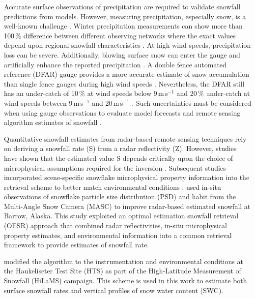 \documentclass{ametsocV5}
\begin{document}
    Accurate surface observations of precipitation are required to validate snowfall predictions from models. However, measuring precipitation, especially snow, is a well-known challenge \citep{theriault_dependence_2012,wolff_measurements_2013,colli_improved_2015}.  Winter precipitation measurements can show more than 100\,\% difference between different observing networks where the exact values depend upon regional snowfall characteristics \citep{kochendorfer_analysis_2017}. At high wind speeds, precipitation loss can be severe. Additionally, blowing surface snow can enter the gauge and artificially enhance the reported precipitation \citep{nitu_iom_2018}. A double fence automated reference (DFAR) gauge provides a more accurate estimate of snow accumulation than single fence gauges during high wind speeds \citep{wolff_derivation_2015,kochendorfer_analysis_2017}. Nevertheless, the DFAR still has an under-catch of 10\,\% at wind speeds below 9\,m\,s$^{-1}$ and 20\,\% under-catch at wind speeds between 9\,m\,s$^{-1}$ and 20\,m\,s$^{-1}$ \citep{nitu_iom_2018}. Such uncertainties must be considered when using gauge observations to evaluate model forecasts and remote sensing algorithm estimates of snowfall \citep{wolff_derivation_2015}. 
    
    Quantitative snowfall estimates from radar-based remote sensing techniques rely on deriving a snowfall rate (S) from a radar reflectivity (Z). However, studies have shown that the estimated value S depends critically upon the choice of microphysical assumptions required for the inversion \citep{kulie_utilizing_2009}. Subsequent studies incorporated scene-specific snowflake microphysical property information into the retrieval scheme to better match environmental conditions \citep{wood_microphysical_2015}. \citet{cooper_variational_2017} used in-situ observations of snowflake particle size distribution (PSD) and habit from the Multi-Angle Snow Camera (MASC) to improve radar-based estimated snowfall at Barrow, Alaska. This study exploited an optimal estimation snowfall retrieval (OESR) approach that combined radar reflectivities, in-situ microphysical property estimates, and environmental information into a common retrieval framework to provide estimates of snowfall rate. 

    
    \citet{schirle_estimation_2019} modified the \citet{cooper_variational_2017} algorithm to the instrumentation and environmental conditions at the Haukeliseter Test Site (HTS) as part of the High-Latitude Measurement of Snowfall (HiLaMS) campaign. This scheme is used in this work to estimate both surface snowfall rates and vertical profiles of snow water content (SWC).
    
\end{document}
